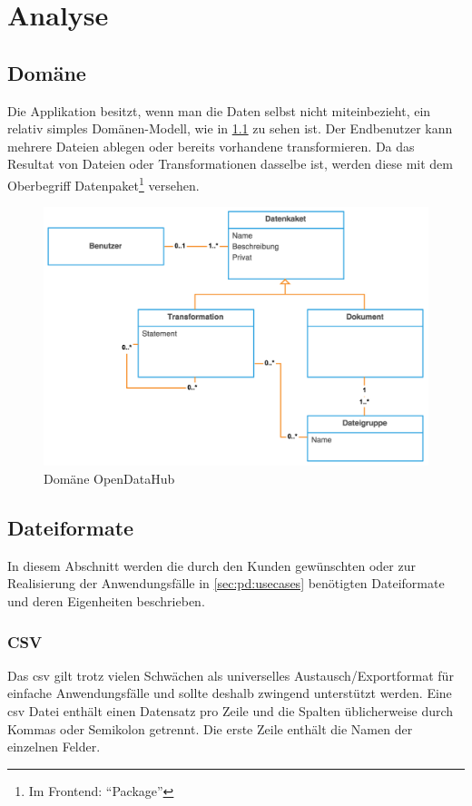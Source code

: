 \chapter{Analyse}


\section{Domäne}

Die Applikation besitzt, wenn man die Daten selbst nicht miteinbezieht, ein relativ simples Domänen-Modell, wie in \cref{fig:pd:domain-model} zu sehen ist. Der Endbenutzer kann mehrere Dateien ablegen oder bereits vorhandene transformieren. Da das Resultat von Dateien oder Transformationen dasselbe ist, werden diese mit dem Oberbegriff Datenpaket\footnote{Im Frontend: ``Package''} versehen.

\begin{figure}[H]
    \centering
    \includegraphics[width=0.8\linewidth]{fig/domain-model.pdf}
    \caption{Domäne OpenDataHub}
    \label{fig:pd:domain-model}
\end{figure}

\section{Dateiformate}

In diesem Abschnitt werden die durch den Kunden gewünschten oder zur Realisierung der Anwendungsfälle in \cref{sec:pd:usecases} benötigten Dateiformate und deren Eigenheiten beschrieben.

\subsection{CSV}
Das \acf{csv} gilt trotz vielen Schwächen als universelles Austausch/Exportformat für einfache Anwendungsfälle und sollte deshalb zwingend unterstützt werden. Eine \acs{csv} Datei enthält einen Datensatz pro Zeile und die Spalten üblicherweise durch Kommas oder Semikolon getrennt. Die erste Zeile enthält die Namen der einzelnen Felder.

